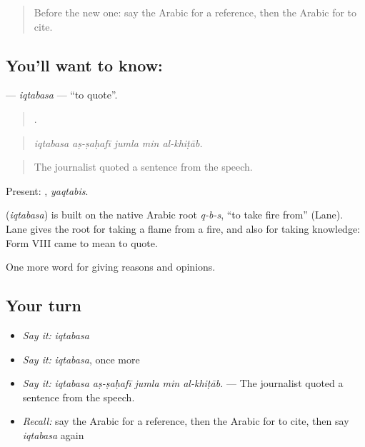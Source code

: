 \label{lesson:AR-C395-iqtabasa}



\begin{quote}
Before the new one: say the Arabic for a reference, then the Arabic for to cite.
\end{quote}

\subsection*{You'll want to know: }
\textbf{} — \emph{iqtabasa} — \textquotedblleft{}to quote\textquotedblright{}.

\begin{quote}
    .
\end{quote}

\begin{quote}
\emph{iqtabasa aṣ-ṣaḥafī jumla min al-khiṭāb.}
\end{quote}

\begin{quote}
The journalist quoted a sentence from the speech.
\end{quote}

Present: , \emph{yaqtabis}.

\begin{cousinweb}
\textbf{} (\emph{iqtabasa}) is built on the native Arabic root \emph{q-b-s}, \textquotedblleft{}to take fire from\textquotedblright{} (Lane). Lane gives the root for taking a flame from a fire, and also for taking knowledge: Form VIII came to mean to quote.
\end{cousinweb}

\begin{grammarlens}[title={What you've built}]
One more word for giving reasons and opinions.
\end{grammarlens}

\subsection*{Your turn}
\begin{itemize}
\raggedright
  \item \emph{Say it:} \emph{iqtabasa}
  \item \emph{Say it:} \emph{iqtabasa}, once more
  \item \emph{Say it:} \emph{iqtabasa aṣ-ṣaḥafī jumla min al-khiṭāb.} — The journalist quoted a sentence from the speech.
  \item \emph{Recall:} say the Arabic for a reference, then the Arabic for to cite, then say \emph{iqtabasa} again
\end{itemize}


